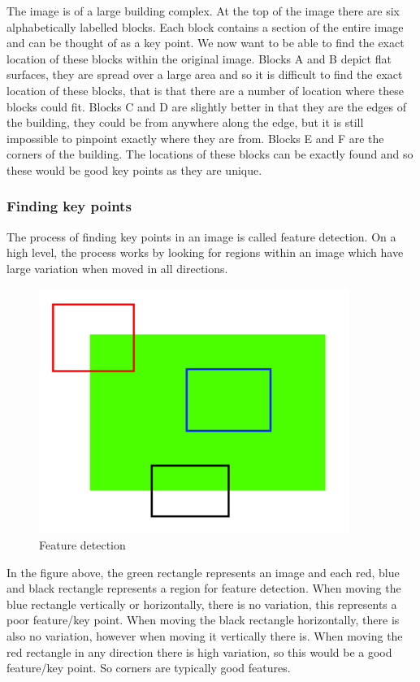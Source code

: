 \documentclass[11pt,a4paper]{report}
\begin{document}
					The image is of a large building complex. At the top of the image there are six alphabetically labelled blocks. Each block contains a section of the entire image and can be thought of as a key point. We now want to be able to find the exact location of these blocks within the original image. 
					Blocks A and B depict flat surfaces, they are spread over a large area and so it is difficult to find the exact location of these blocks, that is that there are a number of location where these blocks could fit.
					Blocks C and D are slightly better in that they are the edges of the building, they could be from anywhere along the edge, but it is still impossible to pinpoint exactly where they are from.
					Blocks E and F are the corners of the building. The locations of these blocks can be exactly found and so these would be good key points as they are unique.
				
				\subsubsection{Finding key points}
					The process of finding key points in an image is called feature detection. On a high level, the process works by looking for regions within an image which have large variation when moved in all directions.
					
					\begin{figure}[H]
						\centering
						\includegraphics[width=0.9\textwidth]{feature_detection}
						\caption{Feature detection}
					\end{figure}
					
					In the figure above, the green rectangle represents an image and each red, blue and black rectangle represents a region for feature detection. When moving the blue rectangle vertically or horizontally, there is no variation, this represents a poor feature/key point. When moving the black rectangle horizontally, there is also no variation, however when moving it vertically there is. When moving the red rectangle in any direction there is high variation, so this would be a good feature/key point. So corners are typically good features.
					
\end{document}
